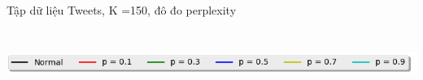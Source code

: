 \documentclass[pdf]{beamer}
\begin{document}
\begin{frame}{Tập dữ liệu Tweets, K =150, đô đo perplexity}
\begin{columns}[T] %
\begin{column}{.50\textwidth}
\begin{figure}
\end{figure}
\end{column} %
\hfill%
\begin{column}{.50\textwidth}
\begin{figure}
\end{figure}				
\end{column} %
\end{columns}
\begin{center}
\includegraphics[width=1\textwidth]{menu.png}	
\end{center}
\end{frame}
\end{document}
